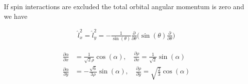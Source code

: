 \documentclass{article}
\begin{document}
If spin interactions are excluded the total orbital angular momentum is zero and we have 

\begin{subequations}
\begin{align}
\hat{l}^{2}_{x} = \hat{l}^{2}_{y} = -\frac{1}{\sin(\theta)} \frac{\partial}{\partial{\theta}} \Big( \sin(\theta) \frac{\partial}{\partial{\theta}} \Big)
\end{align}
\end{subequations}



\begin{subequations}
\begin{align*}
        \frac{\partial \alpha}{\partial x} &= \frac{1}{\sqrt{2} \rho} \cos(\alpha), \quad \frac{\partial \rho}{\partial x} = \frac{1}{\sqrt{2}} \sin(\alpha) \\
        \frac{\partial \alpha}{\partial y} &= -\frac{\sqrt{6}}{3 \rho} \sin(\alpha), \quad \frac{\partial \rho}{\partial y} = \sqrt{\frac{2}{3}} \cos(\alpha)
\end{align*}
\end{subequations}
\end{document}

